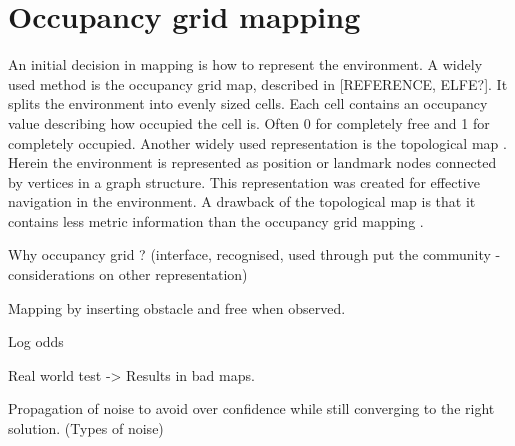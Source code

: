 \section{Occupancy grid mapping}

An initial decision in mapping is how to represent the environment. A widely used method is the occupancy grid map, described in [REFERENCE, ELFE?]. It splits the environment into evenly sized cells. Each cell contains an occupancy value describing how occupied the cell is. Often 0 for completely free and 1 for completely occupied.  
Another widely used representation is the topological map \cite{topologyOrig}. Herein the environment is represented as position or landmark nodes connected by vertices in a graph structure. This representation was created for effective navigation in the environment. A drawback of the topological map is that it contains less metric information than the occupancy grid mapping \cite{mapbuildingSummary}.


Why occupancy grid ? (interface, recognised, used through put the community - considerations on other representation)

Mapping by inserting obstacle and free when observed.

Log odds

Real world test -> Results in bad maps.

Propagation of noise to avoid over confidence while still converging to the right solution. (Types of noise)

